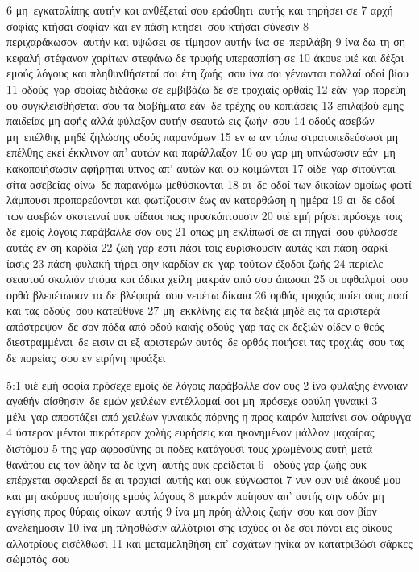 \documentclass[10pt,oneside,footinclude=true,headinclude=true]{scrbook} %
\begin{document}
6 μη εγκαταλίπης αυτήν και ανθέξεταί σου εράσθητι αυτής και τηρήσει σε
7 αρχή σοφίας κτήσαι σοφίαν και εν πάση κτήσει σου κτήσαι σύνεσιν
8 περιχαράκωσον αυτήν και υψώσει σε τίμησον αυτήν ίνα σε περιλάβη
9 ίνα δω τη ση κεφαλή στέφανον χαρίτων στεφάνω δε τρυφής υπερασπίση σε
10 άκουε υιέ και δέξαι εμούς λόγους και πληθυνθήσεταί σοι έτη ζωής σου ίνα σοι γένωνται πολλαί οδοί βίου
11 οδούς γαρ σοφίας διδάσκω σε εμβιβάζω δε σε τροχιαίς ορθαίς
12 εάν γαρ πορεύη ου συγκλεισθήσεταί σου τα διαβήματα εάν δε τρέχης ου κοπιάσεις
13 επιλαβού εμής παιδείας μη αφής αλλά φύλαξον αυτήν σεαυτώ εις ζωήν σου
14 οδούς ασεβών μη επέλθης μηδέ ζηλώσης οδούς παρανόμων
15 εν ω αν τόπω στρατοπεδεύσωσι μη επέλθης εκεί έκκλινον απ' αυτών και παράλλαξον
16 ου γαρ μη υπνώσωσιν εάν μη κακοποιήσωσιν αφήρηται ύπνος απ' αυτών και ου κοιμώνται
17 οίδε γαρ σιτούνται σίτα ασεβείας οίνω δε παρανόμω μεθύσκονται
18 αι δε οδοί των δικαίων ομοίως φωτί λάμπουσι προπορεύονται και φωτίζουσιν έως αν κατορθώση η ημέρα
19 αι δε οδοί των ασεβών σκοτειναί ουκ οίδασι πως προσκόπτουσιν
20 υιέ εμή ρήσει πρόσεχε τοις δε εμοίς λόγοις παράβαλλε σον ους
21 όπως μη εκλίπωσί σε αι πηγαί σου φύλασσε αυτάς εν ση καρδία
22 ζωή γαρ εστι πάσι τοις ευρίσκουσιν αυτάς και πάση σαρκί ίασις
23 πάση φυλακή τήρει σην καρδίαν εκ γαρ τούτων έξοδοι ζωής
24 περίελε σεαυτού σκολιόν στόμα και άδικα χείλη μακράν από σου άπωσαι
25 οι οφθαλμοί σου ορθά βλεπέτωσαν τα δε βλέφαρά σου νευέτω δίκαια
26 ορθάς τροχιάς ποίει σοις ποσί και τας οδούς σου κατεύθυνε
27 μη εκκλίνης εις τα δεξιά μηδέ εις τα αριστερά απόστρεψον δε σον πόδα από οδού κακής οδούς γαρ τας εκ δεξιών οίδεν ο θεός διεστραμμέναι δε εισιν αι εξ αριστερών αυτός δε ορθάς ποιήσει τας τροχιάς σου τας δε πορείας σου εν ειρήνη προάξει
\par
5:1 υιέ εμή σοφία πρόσεχε εμοίς δε λόγοις παράβαλλε σον ους
2 ίνα φυλάξης έννοιαν αγαθήν αίσθησιν δε εμών χειλέων εντέλλομαί σοι μη πρόσεχε φαύλη γυναικί
3 μέλι γαρ αποστάζει από χειλέων γυναικός πόρνης η προς καιρόν λιπαίνει σον φάρυγγα
4 ύστερον μέντοι πικρότερον χολής ευρήσεις και ηκονημένον μάλλον μαχαίρας διστόμου
5 της γαρ αφροσύνης οι πόδες κατάγουσι τους χρωμένους αυτή μετά θανάτου εις τον άδην τα δε ίχνη αυτής ουκ ερείδεται
6  οδούς γαρ ζωής ουκ επέρχεται σφαλεραί δε αι τροχιαί αυτής και ουκ εύγνωστοι
7 νυν ουν υιέ άκουέ μου και μη ακύρους ποιήσης εμούς λόγους
8 μακράν ποίησον απ' αυτής σην οδόν μη εγγίσης προς θύραις οίκων αυτής
9 ίνα μη πρόη άλλοις ζωήν σου και σον βίον ανελεήμοσιν
10 ίνα μη πλησθώσιν αλλότριοι σης ισχύος οι δε σοι πόνοι εις οίκους αλλοτρίους εισέλθωσι
11 και μεταμεληθήση επ' εσχάτων ηνίκα αν κατατριβώσι σάρκες σώματός σου
\end{document}
